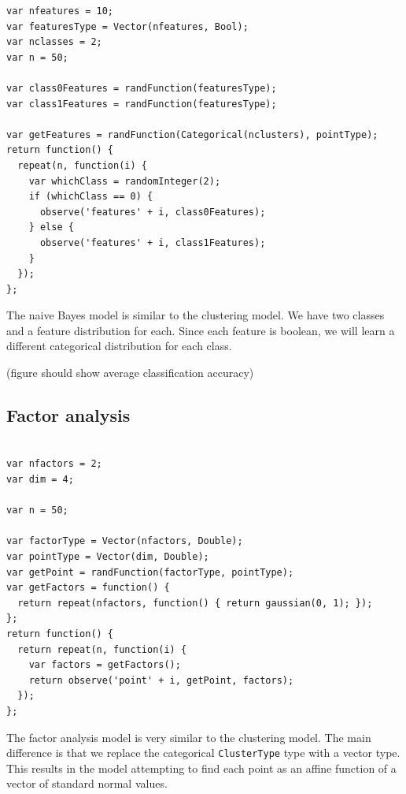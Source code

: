 \documentclass{article}
\begin{document}
{\small
\begin{verbatim}
var nfeatures = 10;
var featuresType = Vector(nfeatures, Bool);
var nclasses = 2;
var n = 50;

var class0Features = randFunction(featuresType);
var class1Features = randFunction(featuresType);

var getFeatures = randFunction(Categorical(nclusters), pointType);
return function() {
  repeat(n, function(i) {
    var whichClass = randomInteger(2);
    if (whichClass == 0) {
      observe('features' + i, class0Features);
    } else {
      observe('features' + i, class1Features);
    }
  });
};
\end{verbatim}
}

The naive Bayes model is similar to the clustering model.  We have two classes and a feature
distribution for each.  Since each feature is boolean, we will learn
a different categorical distribution for each class.

(figure should show average classification accuracy)

  \subsection{Factor analysis}
{\small
\begin{verbatim}

var nfactors = 2;
var dim = 4;

var n = 50;

var factorType = Vector(nfactors, Double);
var pointType = Vector(dim, Double);
var getPoint = randFunction(factorType, pointType);
var getFactors = function() {
  return repeat(nfactors, function() { return gaussian(0, 1); });
};
return function() {
  return repeat(n, function(i) {
    var factors = getFactors();
    return observe('point' + i, getPoint, factors);
  });
};
\end{verbatim}
}

The factor analysis model is very similar to the clustering model.  The main difference is that we replace the categorical \texttt{ClusterType} type with a vector type.  This results in the model attempting to find each point as an affine function of a vector of standard normal values.
\end{document}
